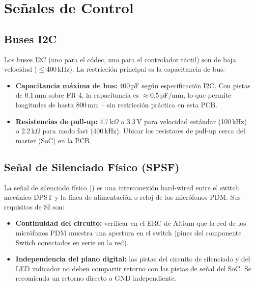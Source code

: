 \section{Señales de Control}
\label{sec:si_control}

\subsection{Buses I2C}
\label{subsec:si_i2c}

\begin{sibox}
  Los buses I2C (uno para el códec, uno para el controlador táctil) son de baja
  velocidad ($\leq$400\,kHz). La restricción principal es la capacitancia de bus:
  \begin{itemize}
    \item \textbf{Capacitancia máxima de bus:} 400\,pF según especificación I2C.
      Con pistas de 0.1\,mm sobre FR-4, la capacitancia es $\approx$0.5\,pF/mm,
      lo que permite longitudes de hasta 800\,mm -- sin restricción práctica en
      esta PCB.
    \item \textbf{Resistencias de pull-up:} 4.7\,k$\Omega$ a 3.3\,V para
      velocidad estándar (100\,kHz) o 2.2\,k$\Omega$ para modo fast (400\,kHz).
      Ubicar los resistores de pull-up cerca del master (SoC) en la PCB.
  \end{itemize}
\end{sibox}

\subsection{Señal de Silenciado Físico (SPSF)}
\label{subsec:si_mute}

\begin{sibox}
  La señal de silenciado físico () es una interconexión
  hard-wired entre el switch mecánico DPST y la línea de alimentación o reloj
  de los micrófonos PDM. Sus requisitos de SI son:
  \begin{itemize}
    \item \textbf{Continuidad del circuito:} verificar en el ERC de Altium que
      la red de los micrófonos PDM muestra una apertura en el switch (pines del
      componente Switch conectados en serie en la red).
    \item \textbf{Independencia del plano digital:} las pistas del circuito de
      silenciado y del LED indicador no deben compartir retorno con las pistas
      de señal del SoC. Se recomienda un retorno directo a GND independiente.
  \end{itemize}
\end{sibox}

